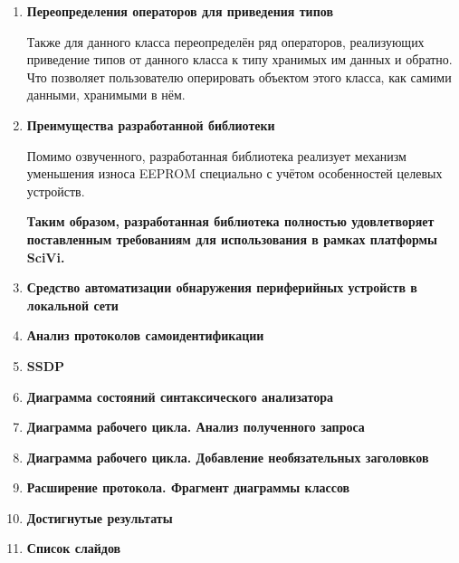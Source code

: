 \documentclass[14pt]{extarticle}
\begin{document}
\begin{enumerate}
	\item \textbf{Переопределения операторов для приведения типов}

	Также для данного класса переопределён ряд операторов, реализующих приведение типов от данного класса к типу хранимых им данных и обратно.
	Что позволяет пользователю оперировать объектом этого класса, как самими данными, хранимыми в нём.

	\item \textbf{Преимущества разработанной библиотеки}

	Помимо озвученного, разработанная библиотека реализует механизм уменьшения износа EEPROM специально с учётом особенностей целевых устройств.

	\textbf{Таким образом, разработанная библиотека полностью удовлетворяет поставленным требованиям для использования в рамках платформы SciVi.}

	\item \textbf{Средство автоматизации обнаружения периферийных устройств в локальной сети}

	\item \textbf{Анализ протоколов самоидентификации}

	\item \textbf{SSDP}

	\item \textbf{Диаграмма состояний синтаксического анализатора}

	\item \textbf{Диаграмма рабочего цикла. Анализ полученного запроса}

	\item \textbf{Диаграмма рабочего цикла. Добавление необязательных заголовков}

	\item \textbf{Расширение протокола. Фрагмент диаграммы классов}

	\item \textbf{Достигнутые результаты}

	\item \textbf{Список слайдов}
\end{enumerate}
\end{document}
